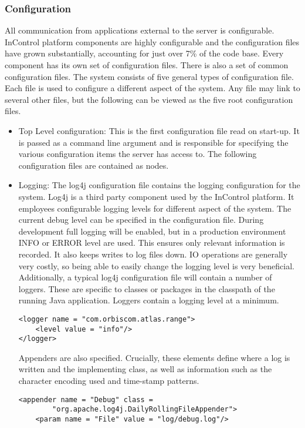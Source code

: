\documentclass[a4paper, 11pt, titlepage]{article}
\begin{document}
\subsubsection{Configuration} 
All communication from applications external to the server is configurable. InControl platform components are highly configurable and the configuration files have grown substantially, accounting for just over 7\% of the code base. Every component has its own set of configuration files. There is also a set of common configuration files. The system consists of five general types of configuration file. Each file is used to configure a different aspect of the system. Any file may link to several other files, but the following can be viewed as the five root configuration files. 
\begin{itemize} 
\item Top Level configuration: This is the first configuration file read on start-up. It is passed as a command line argument and is responsible for specifying the various configuration items the server has access to. The following configuration files are contained as nodes. 
\item Logging: The log4j configuration file contains the logging configuration for the system. Log4j is a third party component used by the InControl platform. It employees configurable logging levels for different aspect of the system. The current debug level can be specified in the configuration file. During development full logging will be enabled, but in a production environment INFO or ERROR level are used. This ensures only relevant information is recorded. It also keeps writes to log files down. IO operations are generally very costly, so being able to easily change the logging level is very beneficial.  Additionally, a typical log4j configuration file will contain a number of loggers. These are specific to classes or packages in the classpath of the running Java application. Loggers contain a logging level at a minimum. 
\begin{verbatim} 
<logger name = "com.orbiscom.atlas.range"> 
    <level value = "info"/> 
</logger> 
\end{verbatim} 
Appenders are also specified. Crucially, these elements define where a log is written and the implementing class, as well as information such as the character encoding used and time-stamp patterns. 
\begin{verbatim} 
<appender name = "Debug" class = 
        "org.apache.log4j.DailyRollingFileAppender"> 
    <param name = "File" value = "log/debug.log"/> 

\end{verbatim}
\end{itemize}
\end{document}

